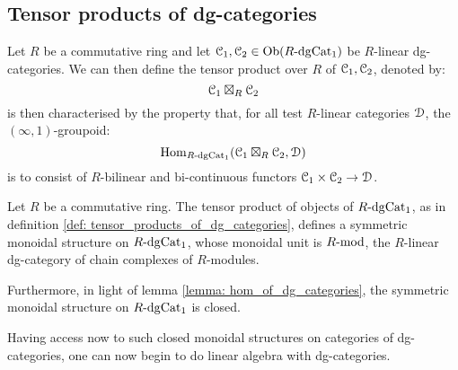         \subsection{Tensor products of dg-categories}
            \begin{definition} \label{def: tensor_products_of_dg_categories}
                Let $R$ be a commutative ring and let $\C_1, \C_2 \in \Ob( R\-\dg\Cat_1 )$ be $R$-linear dg-categories. We can then define the tensor product over $R$ of $\C_1, \C_2$, denoted by:
                    $$\C_1 \boxtimes_R \C_2$$
                is then characterised by the property that, for all test $R$-linear categories $\D$, the $(\infty, 1)$-groupoid:
                    $$\Hom_{R\-\dg\Cat_1}(\C_1 \boxtimes_R \C_2, \D)$$
                is to consist of $R$-bilinear and bi-continuous functors $\C_1 \x \C_2 \to \D$.
            \end{definition}
            \begin{proposition} \label{prop: symmetric_monoidoial_structure_on_the_category_of_dg_categories}
                Let $R$ be a commutative ring. The tensor product of objects of $R\-\dg\Cat_1$, as in definition \ref{def: tensor_products_of_dg_categories}, defines a symmetric monoidal structure on $R\-\dg\Cat_1$, whose monoidal unit is $R\mod$, the $R$-linear dg-category of chain complexes of $R$-modules.

                Furthermore, in light of lemma \ref{lemma: hom_of_dg_categories}, the symmetric monoidal structure on $R\-\dg\Cat_1$ is closed.
            \end{proposition}
            Having access now to such closed monoidal structures on categories of dg-categories, one can now begin to do linear algebra with dg-categories.

